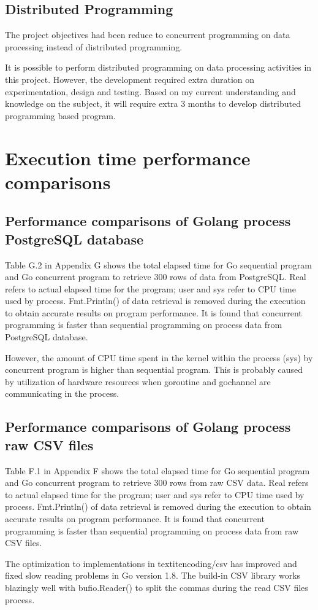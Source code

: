 \subsection{Distributed Programming} 

The project objectives had been reduce to concurrent programming on data processing instead of distributed programming. 

It is possible to perform distributed programming on data processing activities in this project. However, the development required extra duration on experimentation, design and testing. Based on my current understanding and knowledge on the subject, it will require extra 3 months to develop distributed programming based program. 

\section{Execution time performance comparisons}

\subsection{Performance comparisons of Golang process PostgreSQL database}

Table G.2 in Appendix G shows the total elapsed time for Go sequential program and Go concurrent program to retrieve 300 rows of data from PostgreSQL. Real refers to actual elapsed time for the program; user and sys refer to CPU time used by process. Fmt.Println() of data retrieval is removed during the execution to obtain accurate results on program performance. It is found that concurrent programming is faster than sequential programming on process data from PostgreSQL database. 

However, the amount of CPU time spent in the kernel within the process (sys) by concurrent program is higher than sequential program. This is probably caused by utilization of hardware resources when goroutine and gochannel are communicating in the process. 

\subsection{Performance comparisons of Golang process raw CSV files}

Table F.1 in Appendix F shows the total elapsed time for Go sequential program and Go concurrent program to retrieve 300 rows from raw CSV data. Real refers to actual elapsed time for the program; user and sys refer to CPU time used by process. Fmt.Println() of data retrieval is removed during the execution to obtain accurate results on program performance. It is found that concurrent programming is faster than sequential programming on process data from raw CSV files. 

The optimization to implementations in textit{encoding/csv} has improved \cite{go1.8-changelog} and fixed slow reading problems in Go version 1.8. The build-in CSV library works blazingly well with bufio.Reader() to split the commas during the read CSV files process. 











